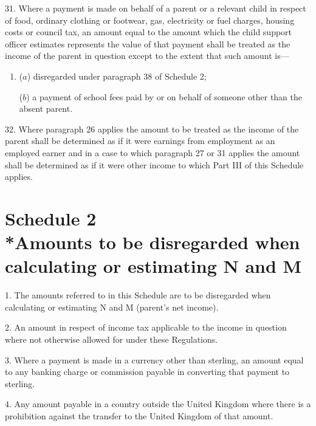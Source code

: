 \documentclass[12pt,a4paper]{article}
\begin{document}
\medskip

31.  Where a payment is made on behalf of a parent or a relevant child in respect of food, ordinary clothing or footwear, gas, electricity or fuel charges, housing costs or council tax, an amount equal to the amount which the child support officer estimates represents the value of that payment shall be treated as the income of the parent in question except to the extent that such amount is—
\begin{enumerate}\item[]
($a$) disregarded under paragraph 38 of Schedule 2;

($b$) a payment of school fees paid by or on behalf of someone other than the absent parent.
\end{enumerate}

\medskip

32.  Where paragraph 26 applies the amount to be treated as the income of the parent shall be determined as if it were earnings from employment as an employed earner and in a case to which paragraph 27 or 31 applies the amount shall be determined as if it were other income to which Part III of this Schedule applies.

\part[Schedule 2 --- Amounts to be disregarded when calculating or estimating N and M]{Schedule 2\\*Amounts to be disregarded when calculating or estimating N and M}

\renewcommand\parthead{--- Schedule 2}

1.  The amounts referred to in this Schedule are to be disregarded when calculating or estimating N and M (parent’s net income).

\medskip

2.  An amount in respect of income tax applicable to the income in question where not otherwise allowed for under these Regulations.

\medskip

3.  Where a payment is made in a currency other than sterling, an amount equal to any banking charge or commission payable in converting that payment to sterling.

\medskip

4.  Any amount payable in a country outside the United Kingdom where there is a prohibition against the transfer to the United Kingdom of that amount.
\end{document}
